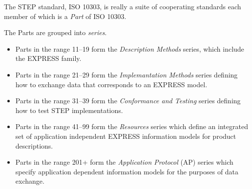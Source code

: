 \cleardoublepage
\normalsize
%
%
\begin{figure}
\centering

\end{figure}
\bodsiz

\begin{remarks}
\remintro


    The STEP standard, ISO 10303, is really a suite of cooperating standards
each member of which is a \emph{Part} of ISO 10303.

    The Parts are grouped into \emph{series}.
\begin{itemize}
\item Parts in the range 11--19 form the \emph{Description Methods} series, 
      which include the EXPRESS family.
\item Parts in the range 21--29 form the \emph{Implemantation Methods} series
      defining how to exchange data that corresponds to an EXPRESS model.
\item Parts in the range 31--39 form the \emph{Conformance and Testing} series
      defining how to test STEP implementations.
\item Parts in the range 41--99 form the \emph{Resources} series which define
      an integrated set of application independent EXPRESS information models 
      for product descriptions.
\item Parts in the range 201+ form the \emph{Application Protocol} (AP) series
      which specify application dependent information models for the purposes
      of data exchange.
\end{itemize}


\remend
\end{remarks}

\clearpage
\normalsize
%
%
%
%
\begin{figure}
\centering

\end{figure}
\bodsiz

